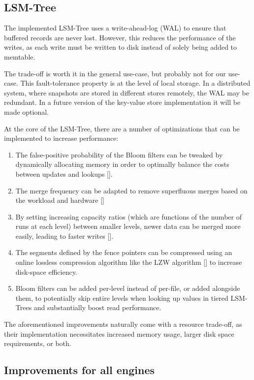 \subsection{LSM-Tree}

The implemented LSM-Tree uses a write-ahead-log (WAL) to ensure that buffered records are never lost. However, this reduces the performance of the writes, as each write must be written to disk instead of solely being added to memtable.

The trade-off is worth it in the general use-case, but probably not for our use-case. This fault-tolerance property is at the level of local storage. In a distributed system, where snapshots are stored in different stores remotely, the WAL may be redundant. In a future version of the key-value store implementation it will be made optional.

At the core of the LSM-Tree, there are a number of optimizations that can be implemented to increase performance:

\begin{enumerate}
    \item The false-positive probability of the Bloom filters can be tweaked by dynamically allocating memory in order to optimally balance the costs between updates and lookups [\cite{lsm-monkey}].
    \item The merge frequency can be adapted to remove superfluous merges based on the workload and hardware [\cite{lsm-dostoevsky}]
    \item By setting increasing capacity ratios (which are functions of the number of runs at each level) between smaller levels, newer data can be merged more easily, leading to faster writes [\cite{lsm-wacky}].
    \item The segments defined by the fence pointers can be compressed using an online lossless compression algorithm like the LZW algorithm [\cite{lzw}] to increase disk-space efficiency.
    \item Bloom filters can be added per-level instead of per-file, or added alongside them, to potentially skip entire levels when looking up values in tiered LSM-Trees and substantially boost read performance.
\end{enumerate}

The aforementioned improvements naturally come with a resource trade-off, as their implementation necessitates increased memory usage, larger disk space requirements, or both.

\subsection{Improvements for all engines}

